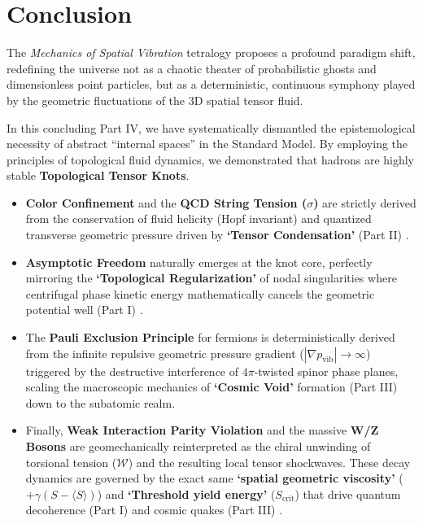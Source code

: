 \documentclass[reprint,amsmath,amssymb,aps,prd]{revtex4-2}
\begin{document}
\section{Conclusion}

The \textit{Mechanics of Spatial Vibration} tetralogy proposes a profound paradigm shift, redefining the universe not as a chaotic theater of probabilistic ghosts and dimensionless point particles, but as a deterministic, continuous symphony played by the geometric fluctuations of the 3D spatial tensor fluid.

In this concluding Part IV, we have systematically dismantled the epistemological necessity of abstract ``internal spaces'' in the Standard Model. By employing the principles of topological fluid dynamics, we demonstrated that hadrons are highly stable \textbf{Topological Tensor Knots}.

\begin{itemize}
    \item \textbf{Color Confinement} and the \textbf{QCD String Tension ($\sigma$)} are strictly derived from the conservation of fluid helicity (Hopf invariant) \cite{Moffatt1969} and quantized transverse geometric pressure driven by \textbf{`Tensor Condensation'} (Part II) \cite{YooPart2}.
    \item \textbf{Asymptotic Freedom} naturally emerges at the knot core, perfectly mirroring the \textbf{`Topological Regularization'} of nodal singularities where centrifugal phase kinetic energy mathematically cancels the geometric potential well (Part I) \cite{YooPart1, Gross1973}.
    \item The \textbf{Pauli Exclusion Principle} \cite{Pauli1925} for fermions is deterministically derived from the infinite repulsive geometric pressure gradient ($|\nabla p_{\mathrm{vib}}| \to \infty$) triggered by the destructive interference of $4\pi$-twisted spinor phase planes, scaling the macroscopic mechanics of \textbf{`Cosmic Void'} formation (Part III) \cite{YooPart3} down to the subatomic realm.
    \item Finally, \textbf{Weak Interaction Parity Violation} \cite{Wu1957} and the massive \textbf{W/Z Bosons} are geomechanically reinterpreted as the chiral unwinding of torsional tension ($\mathcal{W}$) and the resulting local tensor shockwaves. These decay dynamics are governed by the exact same \textbf{`spatial geometric viscosity'} ($+\gamma(S - \langle S \rangle)$) and \textbf{`Threshold yield energy'} ($S_{\mathrm{crit}}$) that drive quantum decoherence (Part I) \cite{YooPart1} and cosmic quakes (Part III) \cite{YooPart3}.
\end{itemize}
\end{document}
